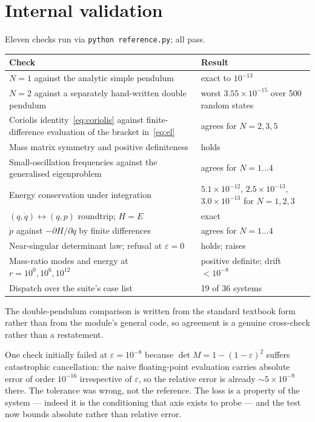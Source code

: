\documentclass[11pt,a4paper]{article}
\begin{document}
\section{Internal validation}\label{sec:selftest}

Eleven checks run via \texttt{python reference.py}; all pass.

\begin{center}
\begin{tabular}{@{}L{0.42\textwidth}L{0.44\textwidth}@{}}
\toprule
\textbf{Check} & \textbf{Result} \\
\midrule
$N=1$ against the analytic simple pendulum & exact to $10^{-13}$ \\
$N=2$ against a separately hand-written double pendulum & worst $3.55\times10^{-15}$ over 500 random states \\
Coriolis identity~\eqref{eq:coriolis} against finite-difference evaluation of the bracket in~\eqref{eq:el} & agrees for $N = 2,3,5$ \\
Mass matrix symmetry and positive definiteness & holds \\
Small-oscillation frequencies against the generalised eigenproblem & agrees for $N=1\ldots4$ \\
Energy conservation under integration & $5.1\times10^{-12}$, $2.5\times10^{-13}$, $3.0\times10^{-13}$ for $N=1,2,3$ \\
$(q,\dot q)\leftrightarrow(q,p)$ roundtrip; $H = E$ & exact \\
$\dot p$ against $-\partial H/\partial q$ by finite differences & agrees for $N=1\ldots4$ \\
Near-singular determinant law; refusal at $\varepsilon=0$ & holds; raises \\
Mass-ratio modes and energy at $r = 10^{0},10^{6},10^{12}$ & positive definite; drift $<10^{-8}$ \\
Dispatch over the suite's case list & 19 of 36 systems \\
\bottomrule
\end{tabular}
\end{center}

The double-pendulum comparison is written from the standard textbook form
rather than from the module's general code, so agreement is a genuine
cross-check rather than a restatement.

One check initially failed at $\varepsilon = 10^{-8}$ because
$\det M = 1-(1-\varepsilon)^{2}$ suffers catastrophic cancellation: the naive
floating-point evaluation carries absolute error of order $10^{-16}$
irrespective of $\varepsilon$, so the relative error is already $\sim
5\times10^{-9}$ there. The tolerance was wrong, not the reference. The loss is
a property of the system --- indeed it is the conditioning that axis exists to
probe --- and the test now bounds absolute rather than relative error.
\end{document}
